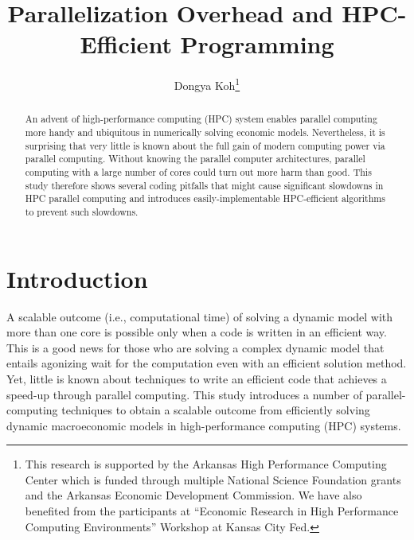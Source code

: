 \documentclass[12pt]{article}
\begin{document}
\sf

\title{\textbf{Parallelization Overhead and HPC-Efficient Programming}}
\author{Dongya Koh\thanks{\sf This research is supported by the Arkansas High Performance Computing Center which is funded through multiple National Science Foundation grants and the Arkansas Economic Development Commission. We have also benefited from the participants at ``Economic Research in High Performance Computing Environments'' Workshop at Kansas City Fed.}}
\maketitle


\begin{abstract}
An advent of high-performance computing (HPC) system enables parallel computing more handy and ubiquitous in numerically solving economic models. Nevertheless, it is surprising that very little is known about the full gain of modern computing power via parallel computing. Without knowing the parallel computer architectures, parallel computing with a large number of cores could turn out more harm than good. This study therefore shows several coding pitfalls that might cause significant slowdowns in HPC parallel computing and introduces easily-implementable HPC-efficient algorithms to prevent such slowdowns.
\end{abstract}


\newpage
\section{Introduction}

A scalable outcome (i.e., computational time) of solving a dynamic model with more than one core is possible only when a code is written in an efficient way. This is a good news for those who are solving a complex dynamic model that entails agonizing wait for the computation even with an efficient solution method. Yet, little is known about techniques to write an efficient code that achieves a speed-up through parallel computing. This study introduces a number of parallel-computing techniques to obtain a scalable outcome from efficiently solving dynamic macroeconomic models in high-performance computing (HPC) systems.
\end{document}
